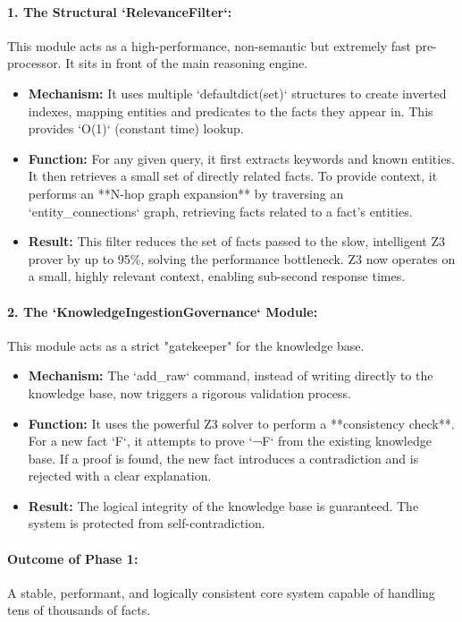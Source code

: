 \documentclass[11pt, a4paper]{article}
\begin{document}
\paragraph{1. The Structural `RelevanceFilter`:} This module acts as a high-performance, non-semantic but extremely fast pre-processor. It sits in front of the main reasoning engine.
\begin{itemize}
    \item \textbf{Mechanism:} It uses multiple `defaultdict(set)` structures to create inverted indexes, mapping entities and predicates to the facts they appear in. This provides `O(1)` (constant time) lookup.
    \item \textbf{Function:} For any given query, it first extracts keywords and known entities. It then retrieves a small set of directly related facts. To provide context, it performs an **N-hop graph expansion** by traversing an `entity_connections` graph, retrieving facts related to a fact's entities.
    \item \textbf{Result:} This filter reduces the set of facts passed to the slow, intelligent Z3 prover by up to 95\%, solving the performance bottleneck. Z3 now operates on a small, highly relevant context, enabling sub-second response times.
\end{itemize}

\paragraph{2. The `KnowledgeIngestionGovernance` Module:} This module acts as a strict "gatekeeper" for the knowledge base.
\begin{itemize}
    \item \textbf{Mechanism:} The `add_raw` command, instead of writing directly to the knowledge base, now triggers a rigorous validation process.
    \item \textbf{Function:} It uses the powerful Z3 solver to perform a **consistency check**. For a new fact `F`, it attempts to prove `¬F` from the existing knowledge base. If a proof is found, the new fact introduces a contradiction and is rejected with a clear explanation.
    \item \textbf{Result:} The logical integrity of the knowledge base is guaranteed. The system is protected from self-contradiction.
\end{itemize}

\paragraph{Outcome of Phase 1:} A stable, performant, and logically consistent core system capable of handling tens of thousands of facts.
\end{document}
